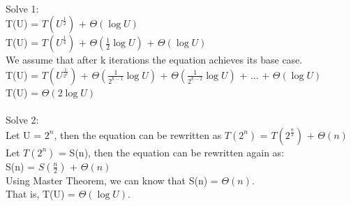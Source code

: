 \begin{problem}{4} ~\\
Solve 1:\\
\tab T(U) = $T({U}^{\frac{1}{2}})$ + $\Theta(\log{U})$\\
\tab T(U) = $T({U}^{\frac{1}{4}})$ + $\Theta(\frac{1}{2}\log{U})$ + $\Theta(\log{U})$\\
\tab We assume that after k iterations the equation achieves its base case.\\
\tab T(U) = $T({U}^{\frac{1}{2^k}})$ + $\Theta(\frac{1}{2^{k-1}}\log{U})$ + $\Theta(\frac{1}{2^{k-2}}\log{U})$ + ... + $\Theta(\log{U})$\\
\tab T(U) = $\Theta(2 \log{U})$\\
\\
Solve 2:\\
\tab Let U = ${2}^{n}$, then the equation can be rewritten as $T(2^n)$ = $T({2}^{\frac{n}{2}})$ + $\Theta(n)$\\ 
\tab Let $T(2^n)$ = S(n), then the equation can be rewritten again as:\\
\tab S(n) = $S(\frac{n}{2})$ + $\Theta(n)$\\
\tab Using Master Theorem, we can know that S(n) = $\Theta(n)$.\\
\tab That is, T(U) = $\Theta(\log {U})$.\\
\end{problem}
